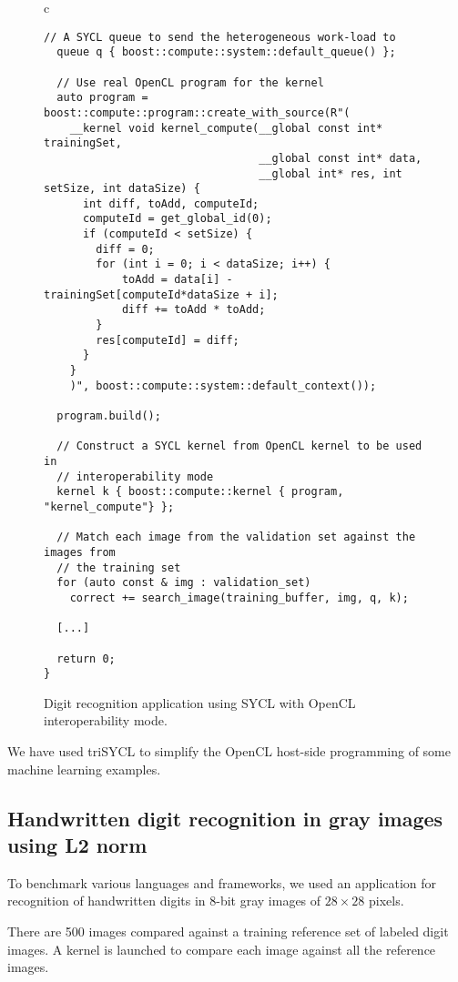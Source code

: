 \documentclass[sigplan]{acmart}
\begin{document}
\begin{figure*}
\begin{tabular}{c}
\begin{lstlisting}[basicstyle=\scriptsize]
  // A SYCL queue to send the heterogeneous work-load to
  queue q { boost::compute::system::default_queue() };

  // Use real OpenCL program for the kernel
  auto program = boost::compute::program::create_with_source(R"(
    __kernel void kernel_compute(__global const int* trainingSet,
                                 __global const int* data,
                                 __global int* res, int setSize, int dataSize) {
      int diff, toAdd, computeId;
      computeId = get_global_id(0);
      if (computeId < setSize) {
        diff = 0;
        for (int i = 0; i < dataSize; i++) {
            toAdd = data[i] - trainingSet[computeId*dataSize + i];
            diff += toAdd * toAdd;
        }
        res[computeId] = diff;
      }
    }
    )", boost::compute::system::default_context());

  program.build();

  // Construct a SYCL kernel from OpenCL kernel to be used in
  // interoperability mode
  kernel k { boost::compute::kernel { program, "kernel_compute"} };

  // Match each image from the validation set against the images from
  // the training set
  for (auto const & img : validation_set)
    correct += search_image(training_buffer, img, q, k);

  [...]

  return 0;
}
    \end{lstlisting}
  \end{tabular}
  \caption{Digit recognition application using SYCL with OpenCL
    interoperability mode.\label{fig:digit-SYCL-OpenCL-code}}
\end{figure*}

We have used triSYCL to simplify the OpenCL host-side programming of
some machine learning examples.


\subsection{Handwritten digit recognition in gray images using L2
  norm}
\label{sec:example-from-anast}

To benchmark various languages and frameworks, we used an application
for recognition of handwritten digits in 8-bit gray images of
$28 \times 28$ pixels.

There are 500 images compared against a training reference
set of labeled digit images. A kernel is launched to compare each
image against all the reference images.
\end{document}
